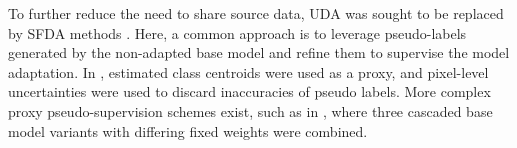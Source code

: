         To further reduce the need to share source data, UDA was sought to be replaced by SFDA methods \citep{yang2022source,wen2023source,chen2021source}.
        Here, a common approach is to leverage pseudo-labels generated by the non-adapted base model and refine them to supervise the model adaptation. In \citep{chen2021source}, estimated class centroids were used as a proxy, and pixel-level uncertainties were used to discard inaccuracies of pseudo labels.
        More complex proxy pseudo-supervision schemes exist, such as in \citep{yang2022source}, where three cascaded base model variants with differing fixed weights were combined.

